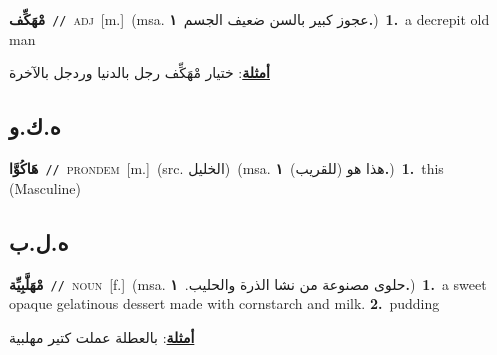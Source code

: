 \documentclass[10pt,a4paper,twoside]{article} %
\begin{document}
\begin{multicols}{2}
{\setlength\topsep{0pt}\textbf{\foreignlanguage{arabic}{مْهَكِّف}}\ {\color{gray}\texttt{//}\color{black}}\ \textsc{adj}\ [m.]\ \color{gray}(msa. \foreignlanguage{arabic}{عجوز كبير بالسن ضعيف الجسم}~\foreignlanguage{arabic}{\textbf{١.}})\color{black}\ \textbf{1.}~a decrepit old man\  \begin{flushright}\color{gray}\foreignlanguage{arabic}{\textbf{\underline{\foreignlanguage{arabic}{أمثلة}}}: ختيار مْهَكِّف رجل بالدنيا وردجل بالآخرة}\end{flushright}\color{black}} \vspace{2mm}

\vspace{-3mm}
\subsection*{\color{blue}\foreignlanguage{arabic}{ه.ك.و}\color{blue}{ (ntws)}} 

{\setlength\topsep{0pt}\textbf{\foreignlanguage{arabic}{هَاكُوَّا}}\ {\color{gray}\texttt{//}\color{black}}\ \textsc{pron\textunderscore dem}\ [m.]\ (src. \color{gray}\foreignlanguage{arabic}{الخليل}\color{black})\ \color{gray}(msa. \foreignlanguage{arabic}{هذا هو (للقريب)}~\foreignlanguage{arabic}{\textbf{١.}})\color{black}\ \textbf{1.}~this (Masculine)\ } \vspace{2mm}

\vspace{-3mm}
\subsection*{\color{blue}\foreignlanguage{arabic}{ه.ل.ب}\color{blue}{}} 

{\setlength\topsep{0pt}\textbf{\foreignlanguage{arabic}{مْهَلَّبِيِّة}}\ {\color{gray}\texttt{//}\color{black}}\ \textsc{noun}\ [f.]\ \color{gray}(msa. \foreignlanguage{arabic}{حلوى مصنوعة من نشا الذرة والحليب.}~\foreignlanguage{arabic}{\textbf{١.}})\color{black}\ \textbf{1.}~a sweet opaque gelatinous dessert made with cornstarch and milk.  \textbf{2.}~pudding\  \begin{flushright}\color{gray}\foreignlanguage{arabic}{\textbf{\underline{\foreignlanguage{arabic}{أمثلة}}}: بالعطلة عملت كتير مهلبية}\end{flushright}\color{black}} \vspace{2mm}


\end{multicols}
\end{document}
